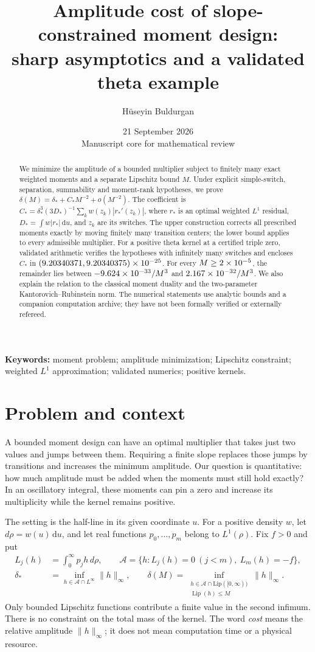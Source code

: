 \documentclass[11pt,a4paper]{article}
\title{Amplitude cost of slope-constrained moment design:\\
sharp asymptotics and a validated theta example}
\author{H\"useyin Buldurgan}
\date{21 September 2026\\\small Manuscript core for mathematical review}
\numberwithin{equation}{section}
\theoremstyle{remark}\newtheorem{remark}[theorem]{Remark}
\DeclareMathOperator{\Lip}{Lip}
\newcommand{\dd}{\,\mathrm du}
\newcommand{\ds}{\delta_*}
\newcommand{\Ds}{D_*}
\newcommand{\Cs}{C_*}
\newcommand{\rs}{r_*}
\newcommand{\norm}[1]{\lVert#1\rVert}
\begin{document}
\maketitle
\begin{abstract}
We minimize the amplitude of a bounded multiplier subject to finitely many
exact weighted moments and a separate Lipschitz bound $M$. Under explicit
simple-switch, separation, summability and moment-rank hypotheses, we prove
$\delta(M)=\ds+\Cs M^{-2}+o(M^{-2})$. The coefficient is
$\Cs=\ds^3(3\Ds)^{-1}\sum_k w(z_k)|\rs'(z_k)|$, where $\rs$ is an optimal
weighted $L^1$ residual, $\Ds=\int w|\rs|\dd$, and $z_k$ are its switches.
The upper construction corrects all prescribed moments exactly by moving
finitely many transition centers; the lower bound applies to every
admissible multiplier. For a positive theta kernel at a certified triple
zero, validated arithmetic verifies the hypotheses with infinitely many
switches and encloses $\Cs$ in
$(9.20340371,9.20340375)\times10^{-25}$. For every $M\ge2\times10^{-5}$, the remainder
lies between $-9.624\times10^{-33}/M^3$ and $2.167\times10^{-32}/M^3$. We also explain the relation
to the classical moment duality and the two-parameter Kantorovich--Rubinstein
norm. The numerical statements use analytic bounds and a companion
computation archive; they have not been formally verified or externally refereed.
\end{abstract}
\noindent\textbf{Keywords:} moment problem; amplitude minimization; Lipschitz
constraint; weighted $L^1$ approximation; validated numerics; positive kernels.

\section{Problem and context}\label{sec:intro}
A bounded moment design can have an optimal multiplier that takes just two
values and jumps between them. Requiring a finite slope replaces those
jumps by transitions and increases the minimum amplitude. Our question is
quantitative: how much amplitude must be added when the moments must still
hold exactly? In an oscillatory integral, these moments can pin a zero and
increase its multiplicity while the kernel remains positive.

The setting is the half-line in its given coordinate $u$. For a positive
density $w$, let $d\rho=w(u)\dd$, and let real functions $p_0,\ldots,p_m$
belong to $L^1(\rho)$. Fix $f>0$ and put
\begin{align}
 L_j(h)&=\int_0^\infty p_jh\,d\rho,\qquad
 \mathcal A=\{h:L_j(h)=0\ (j<m),\ L_m(h)=-f\},\label{eq:target}\\
 \ds&=\inf_{h\in\mathcal A\cap L^\infty}\norm h_\infty,\qquad
 \delta(M)=\inf_{\substack{h\in\mathcal A\cap\mathrm{Lip}([0,\infty))\\
                         \Lip(h)\le M}}\norm h_\infty.\label{eq:cost}
\end{align}
Only bounded Lipschitz functions contribute a finite value in the second
infimum. There is no constraint on the total mass of the kernel.
The word \emph{cost} means the relative amplitude $\norm h_\infty$;
it does not mean computation time or a physical resource.
\end{document}
